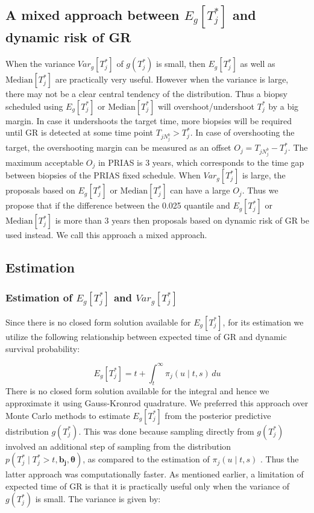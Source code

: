\subsection{A mixed approach between $E_g[T^*_j]$ and dynamic risk of GR}
\label{subsec : mixed_approach}
When the variance $Var_g[T^*_j]$ of $g(T^*_j)$ is small, then $E_g[T^*_j]$ as well as $\text{Median}[T^*_j]$ are practically very useful. However when the variance is large, there may not be a clear central tendency of the distribution. Thus a biopsy scheduled using $E_g[T^*_j]$ or $\text{Median}[T^*_j]$ will overshoot/undershoot $T^*_j$ by a big margin. In case it undershoots the target time, more biopsies will be required until GR is detected at some time point $T_{j{N_j^b}} >  T^*_j$. In case of overshooting the target, the overshooting margin can be measured as an offset $O_j = T_{j{N_j^b}} - T_j^*$. The maximum acceptable $O_j$ in PRIAS is 3 years, which corresponds to the time gap between biopsies of the PRIAS fixed schedule. When $Var_g[T^*_j]$ is large, the proposals based on $E_g[T^*_j]$ or $\text{Median}[T^*_j]$ can have a large $O_j$. Thus we propose that if the difference between the 0.025 quantile and $E_g[T^*_j]$ or $\text{Median}[T^*_j]$ is more than 3 years then proposals based on dynamic risk of GR be used instead. We call this approach a mixed approach.

\subsection{Estimation}
\subsubsection{Estimation of $E_g[T^*_j]$ and $Var_g[T^*_j]$}
Since there is no closed form solution available for $E_g[T^*_j]$, for its estimation we utilize the following relationship between expected time of GR and dynamic survival probability:

\begin{equation*}
E_g[T^*_j] = t + \int_t^\infty \pi_j(u \mid t, s) \,du
\end{equation*}
There is no closed form solution available for the integral and hence we approximate it using Gauss-Kronrod quadrature. We preferred this approach over Monte Carlo methods to estimate $E_g[T^*_j]$ from the posterior predictive distribution $g(T^*_j)$. This was done because sampling directly from $g(T^*_j)$ involved an additional step of sampling from the distribution $p(T^*_j \mid T^*_j > t, \boldsymbol{b_j}, \boldsymbol{\theta})$, as compared to the estimation of $\pi_j(u \mid t, s)$ \citep{rizopoulos2011dynamic}. Thus the latter approach was computationally faster. As mentioned earlier, a limitation of expected time of GR is that it is practically useful only when the variance of $g(T^*_j)$ is small. The variance is given by:

